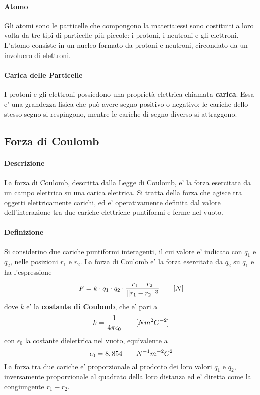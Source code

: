 \documentclass[a4paper, 10pt]{article}
\begin{document}
		\paragraph*{Atomo} Gli atomi sono le particelle che compongono la materia:essi sono costituiti a loro volta da
						   tre tipi di particelle più piccole: i protoni, i neutroni e gli elettroni. 
						   L'atomo consiste in un nucleo formato da protoni e neutroni, circondato da un involucro di
						   elettroni.
		\paragraph*{Carica delle Particelle} I protoni e gli elettroni possiedono una proprietà elettrica chiamata
										    \textbf{carica}. Essa e' una grandezza fisica che può avere segno positivo o
										    negativo: le cariche dello stesso segno si respingono, mentre le cariche 
										    di segno diverso si attraggono.
		\subsection{Forza di Coulomb}
		\paragraph*{Descrizione} La forza di Coulomb, descritta dalla Legge di Coulomb, e' la forza esercitata da un 
								campo elettrico su una carica elettrica. Si tratta della forza che agisce tra oggetti
								elettricamente carichi, ed e' operativamente definita dal valore dell'interazione tra 
								due cariche elettriche puntiformi e ferme nel vuoto.
		\paragraph{Definizione} Si considerino due cariche puntiformi interagenti, il cui valore e' indicato con $q_1$ e 
							   $q_2$, nelle posizioni $r_1$ e $r_2$. La forza di Coulomb e' la forza esercitata da $q_2$ 
							   su $q_1$ e ha l'espressione
							   \[ F = k \cdot q_1 \cdot q_2 \cdot \frac{r_1 - r_2 }{\vert \vert r_1 - r_2 \vert \vert ^3}
							   \hspace{0.7cm} [N] \]
							   dove $k$ e' la \textbf{costante di Coulomb}, che e' pari a 
							   \[k = \frac{1}{4\pi \epsilon_0} \hspace{0.7cm} [N m^2 C^{-2}]\] 
							   con $\epsilon_0$ la costante dielettrica nel vuoto, equivalente a 
							   \[ \epsilon_0 = 8,854 \hspace{0.7cm} N^{-1} m^{-2} C^2 \]
							   La forza tra due cariche e' proporzionale al prodotto dei loro valori $q_1$ e $q_2$,
							   inversamente proporzionale al quadrato della loro distanza ed e' diretta come la congiungente
							   $r_1 - r_2$.
\end{document}
